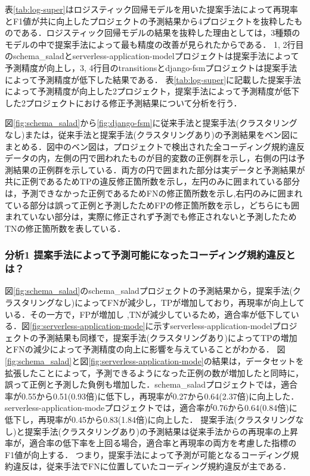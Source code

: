 \documentclass[submit,noauthor,dvipdfmx]{ipsj}
\begin{document}
表\ref{tab:log-super}はロジスティック回帰モデルを用いた提案手法によって再現率とF1値が共に向上したプロジェクトの予測結果から4プロジェクトを抜粋したものである．ロジスティック回帰モデルの結果を抜粋した理由としては，3種類のモデルの中で提案手法によって最も精度の改善が見られたからである．
1, 2行目のschema\_saladとserverless-application-modelプロジェクトは提案手法によって予測精度が向上し，3, 4行目のtransitionsとdjango-fsmプロジェクトは提案手法によって予測精度が低下した結果である．
表\ref{tab:log-super}に記載した提案手法によって予測精度が向上した2プロジェクト，提案手法によって予測精度が低下した2プロジェクトにおける修正予測結果について分析を行う．

図\ref{fig:schema_salad}から\ref{fig:django-fsm}に従来手法と提案手法(クラスタリングなし)または，従来手法と提案手法(クラスタリングあり)の予測結果をベン図にまとめる．図中のベン図は，プロジェクトで検出された全コーディング規約違反データの内，左側の円で囲われたものが目的変数の正例群を示し，右側の円は予測結果の正例群を示している．両方の円で囲まれた部分は実データと予測結果が共に正例であるためTPの違反修正箇所数を示し，左円のみに囲まれている部分は，予測できなかった正例であるためFNの修正箇所数を示し,右円のみに囲まれている部分は誤って正例と予測したためFPの修正箇所数を示し，どちらにも囲まれていない部分は，実際に修正されず予測でも修正されないと予測したためTNの修正箇所数を表している．

\subsubsection*{分析1 提案手法によって予測可能になったコーディング規約違反とは？}

図\ref{fig:schema_salad}のschema\_saladプロジェクトの予測結果から，提案手法(クラスタリングなし)によってFNが減少し，TPが増加しており，再現率が向上している．その一方で，FPが増加し ,TNが減少しているため，適合率が低下している．図\ref{fig:serverless-application-mode}に示すserverless-application-modelプロジェクトの予測結果も同様で，提案手法(クラスタリングあり)によってTPの増加とFNの減少によって予測精度の向上に影響を与えていることがわかる．
図\ref{fig:schema_salad}と図\ref{fig:serverless-application-mode}の結果は，データセットを拡張したことによって，予測できるようになった正例の数が増加したと同時に，誤って正例と予測した負例も増加した．schema\_saladプロジェクトでは，適合率が0.55から0.51(0.93倍)に低下し，再現率が0.27から0.64(2.37倍)に向上した．serverless-application-modeプロジェクトでは，適合率が0.76から0.64(0.84倍)に低下し，再現率が0.45から0.83(1.84倍)に向上した．
提案手法(クラスタリングなし)と提案手法(クラスタリングあり)の予測結果は従来手法からの再現率の上昇率が，適合率の低下率を上回る場合，適合率と再現率の両方を考慮した指標のF1値が向上する．
つまり，提案手法によって予測が可能となるコーディング規約違反は，従来手法でFNに位置していたコーディング規約違反が主である．
\end{document}
